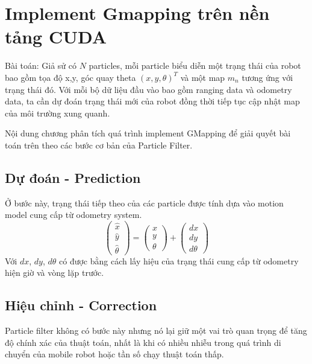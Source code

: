 \documentclass[../../main.tex]{subfiles}
\begin{document}
\graphicspath{{img/}{05_software/img/}}

\chapter{Implement Gmapping trên nền tảng CUDA}


Bài toán: Giả sử có $N$ particles, mỗi particle biểu diễn một trạng thái của robot bao gồm tọa độ x,y, góc quay theta $(x, y, \theta)^T$ và một map $m_n$ tương ứng với trạng thái đó. Với mỗi bộ dữ liệu đầu vào bao gồm ranging data và odometry data, ta cần dự đoán trạng thái mới của robot đồng thời tiếp tục cập nhật map của môi trường xung quanh.

Nội dung chương phân tích quá trình implement GMapping để giải quyết bài toán trên theo các bước cơ bản của Particle Filter.

\section{Dự đoán - Prediction}
Ở bước này, trạng thái tiếp theo của các particle được tính dựa vào motion model cung cấp từ odometry system. 
\begin{equation}
    \begin{pmatrix}
        \hat{x} \\ \hat{y} \\ \hat{\theta}
    \end{pmatrix}
    = 
    \begin{pmatrix}
        x \\ y \\ \theta
    \end{pmatrix}
    + 
    \begin{pmatrix}
        dx \\ dy \\ d\theta
    \end{pmatrix}
\end{equation}
Với $dx$, $dy$, $d\theta$ có được bằng cách lấy hiệu của trạng thái cung cấp từ odometry hiện giờ và vòng lặp trước.

\section{Hiệu chỉnh - Correction}
Particle filter không có bước này nhưng nó lại giữ một vai trò quan trọng để tăng độ chính xác của thuật toán, nhất là khi có nhiều nhiễu trong quá trình di chuyển của mobile robot hoặc tần số  chạy thuật toán thấp.
\end{document}
